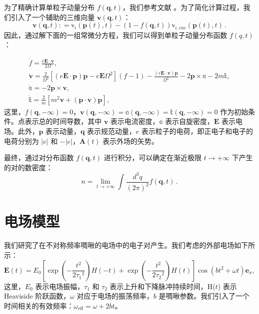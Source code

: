 为了精确计算单粒子动量分布 $f({\mathbf q},t)$，我们参考文献 \cite{2016b}。为了简化计算过程，我们引入了一个辅助的三维向量 $\mathbf{v} (\mathbf{q},t)$：
\begin{equation}
\mathbf{v} (\mathbf{q},t) : = {\mathbb v}_i (\mathbf{p}(t),t) -
(1-f({\mathbf q},t))  {\mathbb v}_{i,vac} (\mathbf{p}(t),t) \, .
\end{equation}
因此，通过解下面的一组常微分方程，我们可以得到单粒子动量分布函数 $f(q, t)$：

\begin{equation}
\begin{array}{l}
\dot{f}=\frac{e\mathbf{E}\cdot \mathbf{v}}{2\Omega},\\
\dot{\mathbf{v}}=\frac{2}{\Omega^{3}}[(e\mathbf{E}\cdot \mathbf{p})\mathbf{p}-e\mathbf{E}\Omega^{2}](f-1)-\frac{(e\mathbf{E}\cdot \mathbf{v})\mathbf{p}}{\Omega^{2}}-2\mathbf{p}\times \mathbb{a}-2m\mathbb{t},\\
\dot{\mathbb{a}}=-2\mathbf{p}\times \mathbf{v},\\
\dot{\mathbb{t}}=\frac{2}{m}[m^{2}\mathbf{v}+(\mathbf{p}\cdot \mathbf{v})\mathbf{p}],
\end{array}\label{eq3}
\end{equation}
这里，$f(\mathbf{q},-\infty)=0$，$\mathbf{v}(\mathbf{q},-\infty)=\mathbb{a}(\mathbf{q},-\infty)=\mathbb{t}(\mathbf{q},-\infty)=0$ 作为初始条件。点表示总的时间导数，其中 $\mathbf{v}$ 表示电流密度，$\mathbb{a}$ 表示自旋密度，$\mathbf{E}$ 表示电场。此外，${\mathbf p}$ 表示动量，$\mathbf{q}$ 表示规范动量，$e$ 表示粒子的电荷，即正电子和电子的电荷分别为 $|e|$ 和 $-|e|$，$\mathbf{A}(t)$ 表示外场的矢势。

最终，通过对分布函数 $f(\mathbf{q},t)$ 进行积分，可以确定在渐近极限 $t\rightarrow+\infty$ 下产生的对的数密度：
\begin{equation}\label{14}
  n = \lim_{t\to +\infty}\int\frac{d^{3}q}{(2\pi)^ 3}f(\mathbf{q},t) \, .
\end{equation}

\section{电场模型}\label{field}

我们研究了在不对称频率啁啾的电场中的电子对产生。我们考虑的外部电场如下所示：
\begin{equation}\label{model2}
\mathbf{E}(t)=E_{0}\left[\exp\left(-\frac{t^2}{2{\tau_1}^2}\right)H(-t)+\exp\left(-\frac{t^2}{2{\tau_2}^2}\right)H(t)\right]\cos\left(bt^2+\omega t\right){\mathbf{e}_x},
\end{equation}
这里，$ E_0$ 表示电场振幅，$\tau_{1}$ 和 $\tau_{2}$ 表示上升和下降脉冲持续时间，H($t$) 表示 Heaviside 阶跃函数，$\omega$ 对应于电场的振荡频率，$b$ 是啁啾参数。我们引入了一个时间相关的有效频率：$\omega_{\text{eff}} = \omega+2bt$。

